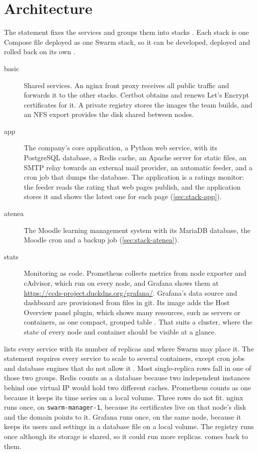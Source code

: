 \section{Architecture}
\label{sec:architecture}

The statement fixes the services and groups them into stacks
\parencite{llusa2026project}. Each stack is one Compose file deployed as
one Swarm stack, so it can be developed, deployed and rolled back on its
own \parencite{llusa2026compose,llusa2026orchestration}.

\begin{description}
  \item[basic] Shared services. An nginx front proxy receives all public
    traffic and forwards it to the other stacks. Certbot obtains and
    renews Let's Encrypt certificates for it. A private registry stores
    the images the team builds, and an NFS export provides the disk
    shared between nodes.
  \item[app] The company's core application, a Python web service, with
    its PostgreSQL database, a Redis cache, an Apache server for static
    files, an SMTP relay towards an external mail provider, an automatic
    feeder, and a cron job that dumps the database. The application is a
    ratings monitor: the feeder reads the rating that web pages publish,
    and the application stores it and shows the latest one for each page
    (\cref{sec:stack-app}).
  \item[atenea] The Moodle learning management system with its MariaDB
    database, the Moodle cron and a backup job (\cref{sec:stack-atenea}).
  \item[stats] Monitoring as code. Prometheus collects metrics from node
    exporter and cAdvisor, which run on every node, and Grafana shows them
    at \url{https://ccds-project.duckdns.org/grafana/}. Grafana's data
    source and dashboard are provisioned from files in git. Its image adds
    the Host Overview panel plugin, which shows many resources, such as
    servers or containers, as one compact, grouped table
    \parencite{grafana-hostoverview}. That suits a cluster, where the
    state of every node and container should be visible at a glance.
\end{description}

 lists every service with its number of replicas and
where Swarm may place it. The statement requires every service to scale
to several containers, except cron jobs and database engines that do not
allow it \parencite{llusa2026project}. Most single-replica rows fall in
one of those two groups. Redis counts as a database because two
independent instances behind one virtual IP would hold two different
caches. Prometheus counts as one because it keeps its time series on a
local volume. Three rows do not fit. nginx runs once, on
\texttt{swarm-manager-1}, because its certificates live on that node's
disk and the domain points to it. Grafana runs once, on the same node,
because it keeps its users and settings in a database file on a local
volume. The registry runs once although its storage is shared, so it
could run more replicas.  comes back to them.


